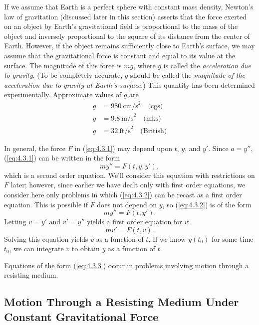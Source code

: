 \documentclass{ximera}
\begin{document}
If we assume that Earth is a perfect sphere with constant mass
density,  Newton's law of gravitation (discussed later in this
section) asserts that the force exerted on an object by Earth's
gravitational field is proportional to the mass of the object and
inversely proportional to the square of its  distance from the
center of Earth. However, if the object remains sufficiently close to
Earth's surface, we may assume that the gravitational force is
constant and equal to its value at the surface. The magnitude of this
force is $mg$, where $g$ is called the \textit{acceleration due to
gravity}. (To be completely accurate, $g$ should be called the \textit{magnitude of the acceleration due to gravity at Earth's surface}.)
This quantity has been determined experimentally. Approximate
values of $g$  are
$$\begin{array}{rl}
g &=980\ \mbox{cm/s}^2\quad \mbox{(cgs)}   \\
g &=9.8\ \mbox{m/s}^2\quad \mbox{(mks)}   \\
g &=32\ \mbox{ft/s}^2\quad \mbox{(British)}
\end{array}$$
 
In general, the force $F$ in (\ref{eq:4.3.1}) may depend upon $t$, $y$, and
$y'$. Since $a=y''$,  (\ref{eq:4.3.1}) can be written in the
form
\begin{equation} \label{eq:4.3.2}
my''=F(t,y,y'),
\end{equation}
which is a second order equation. We'll consider this equation with
restrictions on $F$ later;     however, since earlier we have
dealt only with first order equations, we consider here only problems in
which (\ref{eq:4.3.2}) can be recast as a first order equation. This is
possible if $F$ does not depend on $y$, so (\ref{eq:4.3.2}) is of the form
$$
my''=F(t,y').
$$
 Letting $v=y'$ and $v'=y''$ yields a first order
equation for $v$:
\begin{equation} \label{eq:4.3.3}
mv'=F(t,v).
\end{equation}
Solving this equation yields $v$ as a function of $t$. If we know
$y(t_0)$ for some time $t_0$, we can  integrate $v$ to obtain $y$
as a function of $t$.
 
Equations of the form (\ref{eq:4.3.3}) occur in problems involving motion
through a resisting medium.
 
 
 
\subsection*{Motion Through a Resisting Medium Under Constant
Gravitational Force}
 
\end{document}
